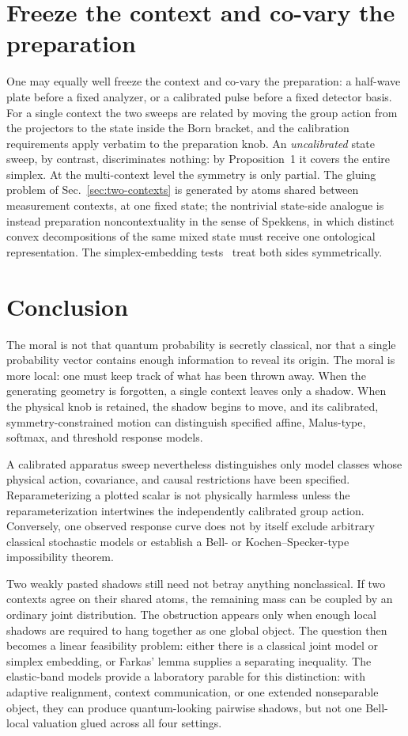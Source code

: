 \documentclass[aps,pra,reprint,superscriptaddress,nofootinbib,floatfix]{revtex4-2}
\begin{document}
\section{Freeze the context and co-vary the preparation}
One may equally well freeze the context and co-vary the preparation: a
half-wave plate before a fixed analyzer, or a calibrated pulse before a
fixed detector basis.  For a single context the two sweeps are related by
moving the group action from the projectors to the state inside the Born
bracket, and the calibration requirements apply verbatim to the preparation
knob.  An \emph{uncalibrated} state sweep, by contrast, discriminates
nothing: by Proposition~1 it covers the entire simplex.  At the
multi-context level the symmetry is only partial.  The gluing problem of
Sec.~\ref{sec:two-contexts} is generated by atoms shared between
measurement contexts, at one fixed state; the nontrivial state-side
analogue is instead preparation noncontextuality in the sense of Spekkens,
in which distinct convex decompositions of the same mixed state must
receive one ontological representation.  The simplex-embedding
tests~\cite{schmid-2021-simplex,selby-2024-lp} treat both sides
symmetrically.


\section{Conclusion}

The moral is not that quantum probability is secretly classical, nor that a
single probability vector contains enough information to reveal its origin.
The moral is more local: one must keep track of what has been thrown away.
When the generating geometry is forgotten, a single context leaves only a
shadow.  When the physical knob is retained, the shadow begins to move, and
its calibrated, symmetry-constrained motion can distinguish specified affine,
Malus-type, softmax, and threshold response models.

A calibrated apparatus sweep nevertheless distinguishes only model classes
whose physical action, covariance, and causal restrictions have been
specified.  Reparameterizing a plotted scalar is not physically harmless
unless the reparameterization intertwines the independently calibrated group
action.  Conversely, one observed response curve does not by itself exclude
arbitrary classical stochastic models or establish a Bell- or
Kochen--Specker-type impossibility theorem.

Two weakly pasted shadows still need not betray anything nonclassical.  If two
contexts agree on their shared atoms, the remaining mass can be coupled by an
ordinary joint distribution.  The obstruction appears only when enough local
shadows are required to hang together as one global object.  The question
then becomes a linear feasibility problem: either there is a classical joint
model or simplex embedding, or Farkas' lemma supplies a separating
inequality.  The elastic-band models provide a laboratory parable for this
distinction: with adaptive realignment, context communication, or one
extended nonseparable object, they can produce quantum-looking pairwise
shadows, but not one Bell-local valuation glued across all four settings.
\end{document}
